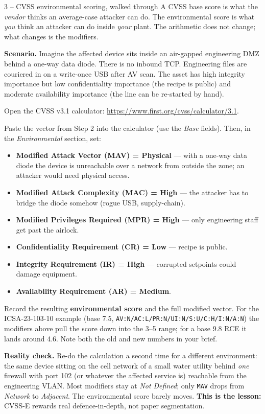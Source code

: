 \documentclass[11pt,a4paper]{article}
\begin{document}
\begin{stepbox}{3 -- CVSS environmental scoring, walked through}
A CVSS base score is what the \emph{vendor} thinks an average-case attacker can do. The environmental score is what \emph{you} think an attacker can do inside \emph{your} plant. The arithmetic does not change; what changes is the modifiers.

\textbf{Scenario.} Imagine the affected device sits inside an air-gapped engineering DMZ behind a one-way data diode. There is no inbound TCP. Engineering files are couriered in on a write-once USB after AV scan. The asset has high integrity importance but low confidentiality importance (the recipe is public) and moderate availability importance (the line can be re-started by hand).

Open the CVSS v3.1 calculator: \url{https://www.first.org/cvss/calculator/3.1}.

Paste the vector from Step 2 into the calculator (use the \emph{Base} fields). Then, in the \emph{Environmental} section, set:

\begin{itemize}\setlength{\itemsep}{1pt}
  \item \textbf{Modified Attack Vector (MAV) = Physical} --- with a one-way data diode the device is unreachable over a network from outside the zone; an attacker would need physical access.
  \item \textbf{Modified Attack Complexity (MAC) = High} --- the attacker has to bridge the diode somehow (rogue USB, supply-chain).
  \item \textbf{Modified Privileges Required (MPR) = High} --- only engineering staff get past the airlock.
  \item \textbf{Confidentiality Requirement (CR) = Low} --- recipe is public.
  \item \textbf{Integrity Requirement (IR) = High} --- corrupted setpoints could damage equipment.
  \item \textbf{Availability Requirement (AR) = Medium}.
\end{itemize}

Record the resulting \textbf{environmental score} and the full modified vector. For the ICSA-23-103-10 example (base 7.5, \texttt{AV:N/AC:L/PR:N/UI:N/S:U/C:H/I:N/A:N}) the modifiers above pull the score down into the 3--5 range; for a base 9.8 RCE it lands around 4.6. Note both the old and new numbers in your brief.

\textbf{Reality check.} Re-do the calculation a second time for a different environment: the same device sitting on the cell network of a small water utility behind \emph{one} firewall with port 102 (or whatever the affected service is) reachable from the engineering VLAN. Most modifiers stay at \emph{Not Defined}; only \texttt{MAV} drops from \emph{Network} to \emph{Adjacent}. The environmental score barely moves. \textbf{This is the lesson:} CVSS-E rewards real defence-in-depth, not paper segmentation.
\end{stepbox}
\end{document}
